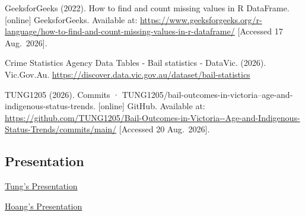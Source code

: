 \documentclass[
]{article}
\begin{document}
GeeksforGeeks (2022). How to find and count missing values in R
DataFrame. {[}online{]} GeeksforGeeks. Available at:
\url{https://www.geeksforgeeks.org/r-language/how-to-find-and-count-missing-values-in-r-dataframe/}
{[}Accessed 17 Aug.~2026{]}.

Crime Statistics Agency Data Tables - Bail statistics - DataVic. (2026).
Vic.Gov.Au.
\url{https://discover.data.vic.gov.au/dataset/bail-statistics}

TUNG1205 (2026). Commits ·
TUNG1205/bail-outcomes-in-victoria--age-and-indigenous-status-trends.
{[}online{]} GitHub. Available at:
\url{https://github.com/TUNG1205/Bail-Outcomes-in-Victoria--Age-and-Indigenous-Status-Trends/commits/main/}
{[}Accessed 20 Aug.~2026{]}.

\subsection{\texorpdfstring{\textbf{Presentation
}}{Presentation }}\label{presentation}

\href{https://rmit-arc.instructuremedia.com/embed/d76b8ee7-93f6-4c7a-8230-d336d4d8617c}{Tung's
Presentation}

\href{https://rmit-arc.instructuremedia.com/embed/a7c0b929-3974-4bcb-80c9-3f5f961197b7}{Hoang's
Presentation}
\end{document}
